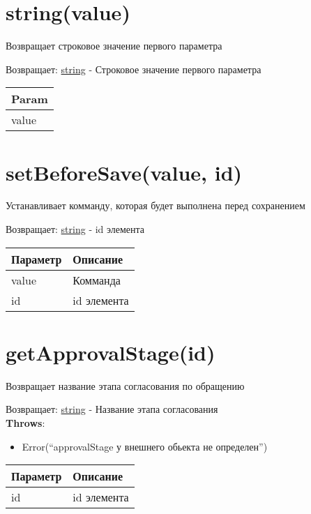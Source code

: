 \hypertarget{stringvalue-string}{%
\section{string(value)}\label{stringvalue-string}}

Возвращает строковое значение первого параметра

Возвращает: \protect\hyperlink{string}{string} - Строковое
значение первого параметра

\begin{longtable}[]{@{}l@{}}
\toprule
Param\tabularnewline
\midrule
\endhead
value\tabularnewline
\bottomrule
\end{longtable}

\hypertarget{setbeforesavevalue-id-string}{%
\section{setBeforeSave(value, id)}\label{setbeforesavevalue-id-string}}

Устанавливает комманду, которая будет выполнена перед сохранением

Возвращает: \protect\hyperlink{string}{string} - id элемента

\begin{longtable}[]{@{}ll@{}}
\toprule
Параметр & Описание\tabularnewline
\midrule
\endhead
value & Комманда\tabularnewline
id & id элемента\tabularnewline
\bottomrule
\end{longtable}

\hypertarget{getapprovalstageid-string}{%
\section{getApprovalStage(id)}\label{getapprovalstageid-string}}

Возвращает название этапа согласования по обращению

Возвращает: \protect\hyperlink{string}{string} - Название этапа
согласования\\
\textbf{Throws}:

\begin{itemize}
\tightlist
\item
  Error(``approvalStage у внешнего обьекта не определен'')
\end{itemize}

\begin{longtable}[]{@{}ll@{}}
\toprule
Параметр & Описание\tabularnewline
\midrule
\endhead
id & id элемента\tabularnewline
\bottomrule
\end{longtable}

